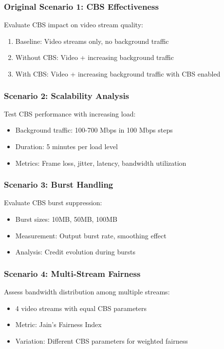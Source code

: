 \documentclass[10pt, journal, compsoc]{IEEEtran}
\begin{document}
\subsubsection{Original Scenario 1: CBS Effectiveness}

Evaluate CBS impact on video stream quality:
\begin{enumerate}
    \item Baseline: Video streams only, no background traffic
    \item Without CBS: Video + increasing background traffic
    \item With CBS: Video + increasing background traffic with CBS enabled
\end{enumerate}

\subsubsection{Scenario 2: Scalability Analysis}

Test CBS performance with increasing load:
\begin{itemize}
    \item Background traffic: 100-700 Mbps in 100 Mbps steps
    \item Duration: 5 minutes per load level
    \item Metrics: Frame loss, jitter, latency, bandwidth utilization
\end{itemize}

\subsubsection{Scenario 3: Burst Handling}

Evaluate CBS burst suppression:
\begin{itemize}
    \item Burst sizes: 10MB, 50MB, 100MB
    \item Measurement: Output burst rate, smoothing effect
    \item Analysis: Credit evolution during bursts
\end{itemize}

\subsubsection{Scenario 4: Multi-Stream Fairness}

Assess bandwidth distribution among multiple streams:
\begin{itemize}
    \item 4 video streams with equal CBS parameters
    \item Metric: Jain's Fairness Index
    \item Variation: Different CBS parameters for weighted fairness
\end{itemize}
\end{document}
